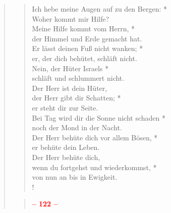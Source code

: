 \begin{quote}
\begin{verse}
Ich hebe meine Augen auf zu den Bergen: *\\
Woher kommt mir Hilfe?\\
\vin Meine Hilfe kommt vom Herrn, *\\
\vin der Himmel und Erde gemacht hat.\\
Er lässt deinen Fuß nicht wanken; *\\
er, der dich behütet, schläft nicht.\\
\vin Nein, der Hüter Israels *\\
\vin schläft und schlummert nicht.\\
Der Herr ist dein Hüter, \\
der Herr gibt dir Schatten; *\\
er steht dir zur Seite.\\
\vin Bei Tag wird dir die Sonne nicht schaden *\\
\vin noch der Mond in der Nacht.\\
Der Herr behüte dich vor allem Bösen, *\\
er behüte dein Leben.\\
\vin Der Herr behüte dich,\\
\vin wenn du fortgehst und wiederkommst, *\\
\vin von nun an bis in Ewigkeit.\\!

\end{verse}

\begin{verse}

\begin{center}
 \textcolor{red}{\normalsize\bf – 122 –}\\
\end{center}

\smallskip


\end{verse}
\end{quote}
